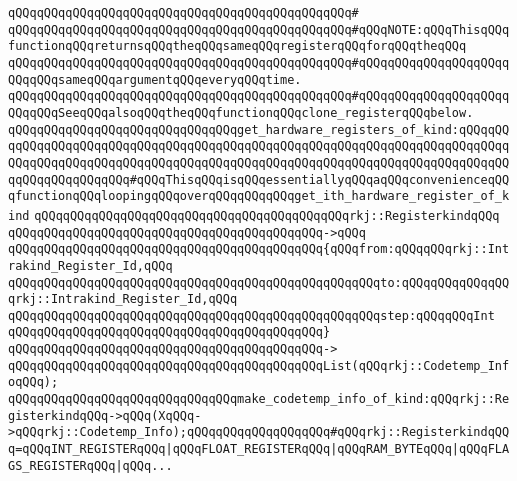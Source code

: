 \verb|qQQqqQQqqQQqqQQqqQQqqQQqqQQqqQQqqQQqqQQqqQQqqQQq#|\newline
\verb|qQQqqQQqqQQqqQQqqQQqqQQqqQQqqQQqqQQqqQQqqQQqqQQq#qQQqNOTE:qQQqThisqQQqfunctionqQQqreturnsqQQqtheqQQqsameqQQqregisterqQQqforqQQqtheqQQq|\newline
\verb|qQQqqQQqqQQqqQQqqQQqqQQqqQQqqQQqqQQqqQQqqQQqqQQq#qQQqqQQqqQQqqQQqqQQqqQQqqQQqsameqQQqargumentqQQqeveryqQQqtime.|\newline
\verb|qQQqqQQqqQQqqQQqqQQqqQQqqQQqqQQqqQQqqQQqqQQqqQQq#qQQqqQQqqQQqqQQqqQQqqQQqqQQqSeeqQQqalsoqQQqtheqQQqfunctionqQQqclone_registerqQQqbelow.|\newline
\newline
\newline
\verb|qQQqqQQqqQQqqQQqqQQqqQQqqQQqqQQqget_hardware_registers_of_kind:qQQqqQQqqQQqqQQqqQQqqQQqqQQqqQQqqQQqqQQqqQQqqQQqqQQqqQQqqQQqqQQqqQQqqQQqqQQqqQQqqQQqqQQqqQQqqQQqqQQqqQQqqQQqqQQqqQQqqQQqqQQqqQQqqQQqqQQqqQQqqQQqqQQqqQQqqQQqqQQqqQQq#qQQqThisqQQqisqQQqessentiallyqQQqaqQQqconvenienceqQQqfunctionqQQqloopingqQQqoverqQQqqQQqqQQqget_ith_hardware_register_of_kind|\newline
\verb|qQQqqQQqqQQqqQQqqQQqqQQqqQQqqQQqqQQqqQQqqQQqrkj::RegisterkindqQQq|\newline
\verb|qQQqqQQqqQQqqQQqqQQqqQQqqQQqqQQqqQQqqQQqqQQq->qQQq|\newline
\verb|qQQqqQQqqQQqqQQqqQQqqQQqqQQqqQQqqQQqqQQqqQQq{qQQqfrom:qQQqqQQqrkj::Intrakind_Register_Id,qQQq|\newline
\verb|qQQqqQQqqQQqqQQqqQQqqQQqqQQqqQQqqQQqqQQqqQQqqQQqqQQqto:qQQqqQQqqQQqqQQqrkj::Intrakind_Register_Id,qQQq|\newline
\verb|qQQqqQQqqQQqqQQqqQQqqQQqqQQqqQQqqQQqqQQqqQQqqQQqqQQqstep:qQQqqQQqInt|\newline
\verb|qQQqqQQqqQQqqQQqqQQqqQQqqQQqqQQqqQQqqQQqqQQq}|\newline
\verb|qQQqqQQqqQQqqQQqqQQqqQQqqQQqqQQqqQQqqQQqqQQq->|\newline
\verb|qQQqqQQqqQQqqQQqqQQqqQQqqQQqqQQqqQQqqQQqqQQqList(qQQqrkj::Codetemp_InfoqQQq);|\newline
\newline
\newline
\newline
\newline
\newline
\verb|qQQqqQQqqQQqqQQqqQQqqQQqqQQqqQQqmake_codetemp_info_of_kind:qQQqrkj::RegisterkindqQQq->qQQq(XqQQq->qQQqrkj::Codetemp_Info);qQQqqQQqqQQqqQQqqQQq#qQQqrkj::RegisterkindqQQq=qQQqINT_REGISTERqQQq|\verb#|qQQqFLOAT_REGISTERqQQq|qQQqRAM_BYTEqQQq|qQQqFLAGS_REGISTERqQQq|qQQq...#\newline
